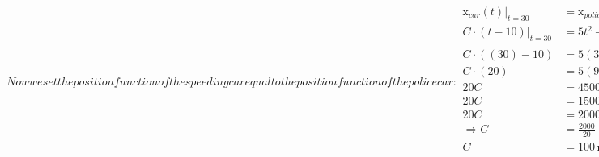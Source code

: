 \documentclass{article}
\newcommand{\x}{\mathrm{x}}
\begin{document}
\begin{subequations}
	Now we set the position function of the speeding car equal to the position function of the police car:
	\begin{align}
		\x_{car}(t) \biggr\rvert_{t=30} &= \x_{police}(t) \biggr\rvert_{t=30} \\
		C\cdot(t-10) \biggr\rvert_{t=30} &= 5t^2-100t+500 \biggr\rvert_{t=30} \\
		C\cdot((30)-10) &= 5(30)^2-100(30)+500 \\
		C\cdot(20) &= 5(900)-3000+500 \\
		20C &= 4500-3000+500 \\
		20C &= 1500+500 \\
		20C &= 2000 \\
		\Rightarrow C &= \frac{2000}{20} \\
		C &= 100 \,\mathrm{m/s} \\
	\end{align}
	\end{subequations}
\end{document}
